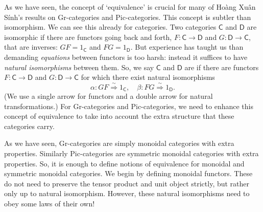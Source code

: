 \documentclass[reqno,12pt]{amsart}
\newcommand{\maps}{\colon}    %
\newcommand{\define}[1]{\textbf{\boldmath{#1}}}
\theoremstyle{definition}
\begin{document}
As we have seen, the concept of `equivalence' is crucial for many of 
Ho\`ang Xu\^an S\'inh's results on Gr-categories and Pic-categories.  This concept is subtler than isomorphism.  We can see this already for categories.  Two categories $\mathsf{C}$ and $\mathsf{D}$ are isomorphic if there are functors going back and forth, $F \maps \mathsf{C} \to \mathsf{D}$ and $G \maps \mathsf{D} \to \mathsf{C}$, that are inverses: $GF = 1_{\mathsf{C}}$ and $FG = 1_\mathsf{D}$.    But experience has taught us than demanding \emph{equations} between functors is too harsh: instead it suffices to have \emph{natural isomorphisms} between them.  So, we say $\mathsf{C}$ and $\mathsf{D}$ are \define{equivalent} if there are functors $F \maps \mathsf{C} \to \mathsf{D}$ and $G \maps \mathsf{D} \to \mathsf{C}$ for which there exist natural isomorphisms
\[   \alpha \maps GF \stackrel{\sim}{\Longrightarrow} 1_{\mathsf{C}}, \quad \beta \maps FG \stackrel{\sim}{\Longrightarrow} 1_\mathsf{D}. \]
(We use a single arrow for functors and a double arrow for natural transformations.)  For Gr-categories and Pic-categories, we need to enhance this concept of equivalence to take into account the extra structure that these categories carry.
 
As we have seen, Gr-categories are simply monoidal categories with extra properties.  Similarly Pic-categories are symmetric monoidal categories with extra properties.  So, it is enough to define notions of equivalence for monoidal and symmetric monoidal categories.  We begin by defining monoidal functors.  These do not need to preserve the tensor product and unit object strictly, but rather only up to natural isomorphism.  However, these natural isomorphisms need to obey some laws of their own!
\end{document}
